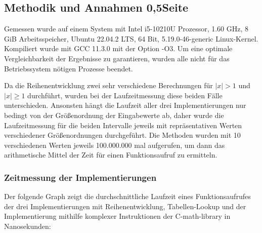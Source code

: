 \documentclass[course=erap] {aspdoc}
\begin{document}
    \subsection{Methodik und Annahmen 0,5Seite}

    Gemessen wurde auf einem System mit Intel i5-10210U Prozessor, 1.60 GHz, 8 GiB Arbeitsspeicher, Ubuntu 22.04.2 LTS, 64 Bit, 5.19.0-46-generic Linux-Kernel.
    Kompiliert wurde mit GCC 11.3.0 mit der Option -O3. Um eine optimale Vergleichbarkeit der Ergebnisse zu garantieren, wurden alle nicht für das Betriebssystem nötigen Prozesse beendet. 

    Da die Reihenentwicklung zwei sehr verschiedene Berechnungen für $|x|>1$ und $|x|\geq 1$ durchführt, wurden bei der Laufzeitmessung diese beiden Fälle unterschieden.
    Ansonsten hängt die Laufzeit aller drei Implementierungen nur bedingt von der Größenordnung der Eingabewerte ab, daher wurde die Laufzeitmessung für die beiden Intervalle jeweils mit repräsentativen Werten verschiedener Größenordnungen durchgeführt.
    Die Methoden wurden mit 10 verschiedenen Werten jeweils 100.000.000 mal aufgerufen, um dann das arithmetische Mittel der Zeit für einen Funktionsaufruf zu ermitteln.

    \subsubsection{Zeitmessung der Implementierungen}

    Der folgende Graph zeigt die durchschnittliche Laufzeit eines Funktionsaufrufes der drei Implementierungen mit Reihenentwicklung, Tabellen-Lookup und der Implementierung mithilfe komplexer Instruktionen der C-math-library in Nanosekunden:

\end{document}
